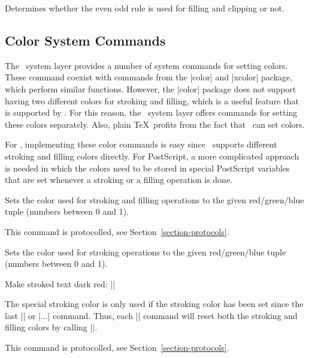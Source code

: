 {\let\ifpgfsys@eorule=\relax
\begin{command}{\ifpgfsys@eorule}
  Determines whether the even odd rule is used for filling and
  clipping or not.
\end{command}
}


\subsection{Color System Commands}

The \pgfname\ system layer provides a number of system commands for
setting colors. These command coexist with commands from the |color|
and |xcolor| package, which perform similar functions. However, the
|color| package does not support having two different colors for
stroking and filling, which is a useful feature that is supported by
\pgfname. For this reason, the \pgfname\ system layer offers commands for
setting these colors separately. Also, plain \TeX\ profits from the
fact that \pgfname\ can set colors.

For \pdf, implementing these color commands is easy since \pdf\
supports different stroking and filling colors directly. For
PostScript, a more complicated approach is needed in which the colors
need to be stored in special PostScript variables that are set
whenever a stroking or a filling operation is done.

\begin{command}{\pgfsys@color@rgb{}}
  Sets the color used for stroking and filling operations to the given
  red/green/blue tuple (numbers between 0 and 1).

  This command is protocolled, see Section~\ref{section-protocols}.
\end{command}

\begin{command}{\pgfsys@color@rgb@stroke{}}
  Sets the color used for stroking operations to the given
  red/green/blue tuple (numbers between 0 and 1).

  \example Make stroked text dark red: ||

  The special stroking color is only used if the stroking color has
  been set since the last |\color| or |\pgfsys@color@...|
  command. Thus, each |\color| command will reset both the stroking
  and filling colors by calling |\pgfsys@color@reset|.

  This command is protocolled, see Section~\ref{section-protocols}.
\end{command}

